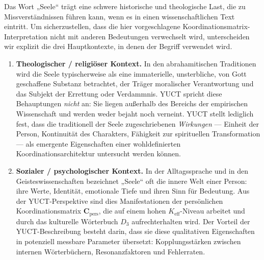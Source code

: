 \documentclass[12pt,a4paper]{article}
\begin{document}
	Das Wort „Seele“ trägt eine schwere historische und theologische Last, die zu Missverständnissen führen kann, wenn es in einen wissenschaftlichen Text eintritt. Um sicherzustellen, dass die hier vorgeschlagene Koordinationsmatrix-Interpretation nicht mit anderen Bedeutungen verwechselt wird, unterscheiden wir explizit die drei Hauptkontexte, in denen der Begriff verwendet wird.
	
	\begin{enumerate}[leftmargin=*]
		\item \textbf{Theologischer / religiöser Kontext.}
		In den abrahamitischen Traditionen wird die Seele typischerweise als eine immaterielle, unsterbliche, von Gott geschaffene Substanz betrachtet, der Träger moralischer Verantwortung und das Subjekt der Errettung oder Verdammnis. YUCT spricht diese Behauptungen \emph{nicht} an: Sie liegen außerhalb des Bereichs der empirischen Wissenschaft und werden weder bejaht noch verneint. YUCT stellt lediglich fest, dass die traditionell der Seele zugeschriebenen \emph{Wirkungen} — Einheit der Person, Kontinuität des Charakters, Fähigkeit zur spirituellen Transformation — als emergente Eigenschaften einer wohldefinierten Koordinationsarchitektur untersucht werden können.
		
		\item \textbf{Sozialer / psychologischer Kontext.}
		In der Alltagssprache und in den Geisteswissenschaften bezeichnet „Seele“ oft die innere Welt einer Person: ihre Werte, Identität, emotionale Tiefe und ihren Sinn für Bedeutung. Aus der YUCT-Perspektive sind dies Manifestationen der persönlichen Koordinationsmatrix \(\mathbf{C}_{\text{pers}}\), die auf einem hohen \(K_{\mathrm{eff}}\)-Niveau arbeitet und durch das kulturelle Wörterbuch \(D_3\) aufrechterhalten wird. Der Vorteil der YUCT-Beschreibung besteht darin, dass sie diese qualitativen Eigenschaften in potenziell messbare Parameter übersetzt: Kopplungsstärken zwischen internen Wörterbüchern, Resonanzfaktoren und Fehlerraten.
		

\end{enumerate}
\end{document}
